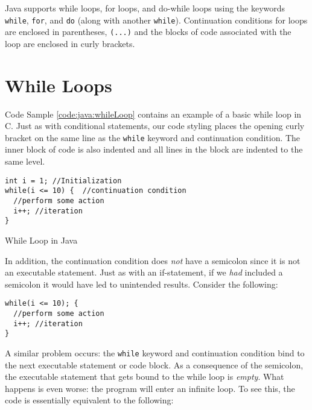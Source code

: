 

Java supports while loops, for loops, and do-while loops using the keywords
\texttt{while}, \texttt{for}, and \texttt{do} (along with 
another \texttt{while}).  Continuation conditions for loops are 
enclosed in parentheses, \texttt{(...)} and the blocks of code
associated with the loop are enclosed in curly brackets.  

\section{While Loops}

Code Sample \ref{code:java:whileLoop} contains an example of a basic
while loop in C.  Just as with conditional statements, our code styling
places the opening curly bracket on the same line as the \texttt{while}
keyword and continuation condition.  The inner block of code is also
indented and all lines in the block are indented to the same level.

\begin{listing}
\begin{verbatim}
int i = 1; //Initialization
while(i <= 10) {  //continuation condition
  //perform some action
  i++; //iteration
}
\end{verbatim}
  \caption{While Loop in Java}
  \label{code:java:whileLoop}
\end{listing}

In addition, the continuation condition does \emph{not} have 
a semicolon since it is not an executable statement.  Just as with
an if-statement, if we \emph{had} included a semicolon it would 
have led to unintended results.  Consider the following:

\begin{verbatim}
while(i <= 10); {
  //perform some action
  i++; //iteration
}
\end{verbatim}

A similar problem occurs: the \texttt{while} keyword and
continuation condition bind to the next executable statement or
code block.  As a consequence of the semicolon, the executable
statement that gets bound to the while loop is \emph{empty}.  What
happens is even worse: the program will enter an infinite loop.  To
see this, the code is essentially equivalent to the following:

